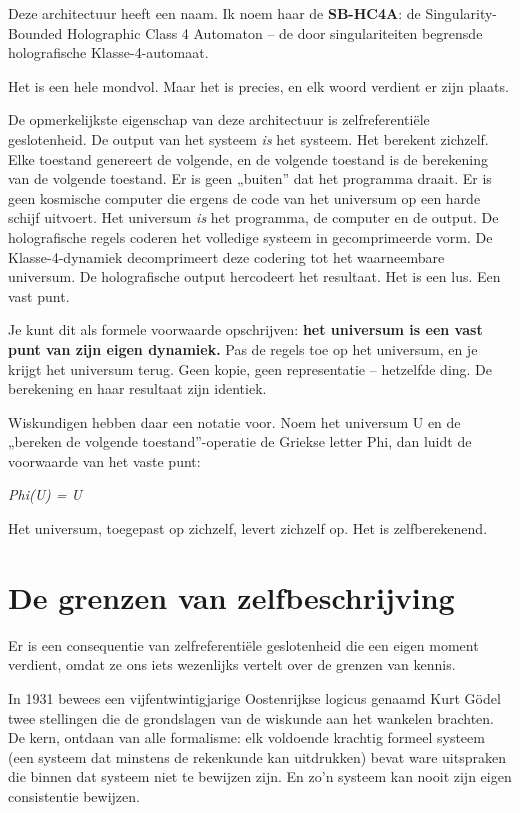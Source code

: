 \documentclass[11pt, twoside, openright]{book}
\begin{document}
Deze architectuur heeft een naam. Ik noem haar de \textbf{SB-HC4A}: de Singularity-Bounded Holographic Class 4 Automaton -- de door singulariteiten begrensde holografische Klasse-4-automaat.

Het is een hele mondvol. Maar het is precies, en elk woord verdient er zijn plaats.

De opmerkelijkste eigenschap van deze architectuur is zelfreferentiële geslotenheid. De output van het systeem \textit{is} het systeem. Het berekent zichzelf. Elke toestand genereert de volgende, en de volgende toestand is de berekening van de volgende toestand. Er is geen „buiten” dat het programma draait. Er is geen kosmische computer die ergens de code van het universum op een harde schijf uitvoert. Het universum \textit{is} het programma, de computer en de output. De holografische regels coderen het volledige systeem in gecomprimeerde vorm. De Klasse-4-dynamiek decomprimeert deze codering tot het waarneembare universum. De holografische output hercodeert het resultaat. Het is een lus. Een vast punt.

Je kunt dit als formele voorwaarde opschrijven: \textbf{het universum is een vast punt van zijn eigen dynamiek.} Pas de regels toe op het universum, en je krijgt het universum terug. Geen kopie, geen representatie -- hetzelfde ding. De berekening en haar resultaat zijn identiek.

Wiskundigen hebben daar een notatie voor. Noem het universum U en de „bereken de volgende toestand”-operatie de Griekse letter Phi, dan luidt de voorwaarde van het vaste punt:

\textit{Phi(U) = U}

Het universum, toegepast op zichzelf, levert zichzelf op. Het is zelfberekenend.


\section*{De grenzen van zelfbeschrijving}

Er is een consequentie van zelfreferentiële geslotenheid die een eigen moment verdient, omdat ze ons iets wezenlijks vertelt over de grenzen van kennis.

In 1931 bewees een vijfentwintigjarige Oostenrijkse logicus genaamd Kurt Gödel twee stellingen die de grondslagen van de wiskunde aan het wankelen brachten. De kern, ontdaan van alle formalisme: elk voldoende krachtig formeel systeem (een systeem dat minstens de rekenkunde kan uitdrukken) bevat ware uitspraken die binnen dat systeem niet te bewijzen zijn. En zo'n systeem kan nooit zijn eigen consistentie bewijzen.
\end{document}
